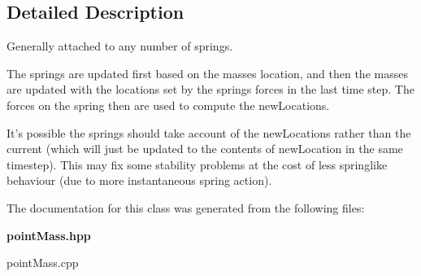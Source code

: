 \subsection{Detailed Description}
Generally attached to any number of springs.

The springs are updated first based on the masses location, and then the masses are updated with the locations set by the springs forces in the last time step. The forces on the spring then are used to compute the new\-Locations.

It's possible the springs should take account of the new\-Locations rather than the current  (which will just be updated to the contents of new\-Location in the same timestep). This may fix some stability problems at the cost of less springlike behaviour (due to more  instantaneous spring action). 



The documentation for this class was generated from the following files:\begin{CompactItemize}
\item 
{\bf point\-Mass.hpp}\item 
point\-Mass.cpp\end{CompactItemize}

